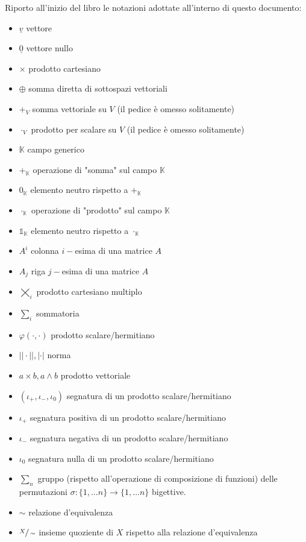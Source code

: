 \documentclass[12pt, twoside, italian]{book}
\begin{document}
	Riporto all'inizio del libro le notazioni adottate all'interno di questo documento:
	\begin{itemize}[label=\hspace{-0.5em}]
		\item $\underline{v}$ vettore
		\item $\underline{0}$ vettore nullo
		\item $\times$ prodotto cartesiano
		\item $\oplus$ somma diretta di sottospazi vettoriali
		\item $+_V$ somma vettoriale su $V$ (il pedice è omesso solitamente)
		\item $\cdot_V$ prodotto per scalare su $V$ (il pedice è omesso solitamente)
		\item $\mathbb{K}$ campo generico
		\item $+_{\mathbb{K}}$ operazione di "somma" sul campo $\mathbb{K}$
		\item $0_\mathbb{K}$ elemento neutro rispetto a $+_\mathbb{K}$
		\item $\cdot_{\mathbb{K}}$ operazione di "prodotto" sul campo $\mathbb{K}$
		\item $\mathds{1}_\mathbb{K}$ elemento neutro rispetto a $\cdot_\mathbb{K}$
		\item $A^{i}$ colonna $i-$esima di una matrice $A$
		\item $A_{j}$ riga $j-$esima di una matrice $A$
		\item $\varprod\limits_i$ prodotto cartesiano multiplo
		\item $\sum\limits_i$ sommatoria
		\item $\varphi(\cdot, \cdot)$ prodotto scalare/hermitiano
		\item $||\cdot||, |\cdot|$ norma
		\item $a \times b, a \wedge b$ prodotto vettoriale
		\item $(\iota_+, \iota_-, \iota_0)$ segnatura di un prodotto scalare/hermitiano
		\item $\iota_+$ segnatura positiva di un prodotto scalare/hermitiano
		\item $\iota_-$ segnatura negativa di un prodotto scalare/hermitiano
		\item $\iota_0$ segnatura nulla di un prodotto scalare/hermitiano
		\item $\sum_{n}$ gruppo (rispetto all'operazione di composizione di funzioni) delle permutazioni $\sigma: \{1, \ldots n \} \to \{1, \ldots n \}$ bigettive.
		\item $\sim$ relazione d'equivalenza
		\item $\sfrac{X}{\sim}$ insieme quoziente di $X$ rispetto alla relazione d'equivalenza
 
	\end{itemize}
	
\end{document}

